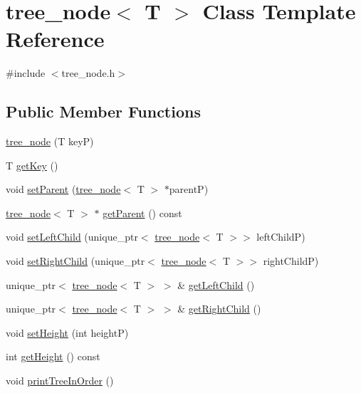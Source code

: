 \hypertarget{classtree__node}{}\section{tree\+\_\+node$<$ T $>$ Class Template Reference}
\label{classtree__node}


{\ttfamily \#include $<$tree\+\_\+node.\+h$>$}

\subsection*{Public Member Functions}
\begin{DoxyCompactItemize}
\item 
\hyperlink{classtree__node_a776da4de6a1faef8b984f8b6dfe6eb6a}{tree\+\_\+node} (T keyP)
\item 
T \hyperlink{classtree__node_afbe2d91ad009570338290ed9eb8a7485}{get\+Key} ()
\item 
void \hyperlink{classtree__node_a1fe75baae3a5d9caa9cb886c54c291e2}{set\+Parent} (\hyperlink{classtree__node}{tree\+\_\+node}$<$ T $>$ $\ast$parentP)
\item 
\hyperlink{classtree__node}{tree\+\_\+node}$<$ T $>$ $\ast$ \hyperlink{classtree__node_aa17e609b57f77bb5446d83c964409ac4}{get\+Parent} () const
\item 
void \hyperlink{classtree__node_a3db979969a0fe8505ba65c7afabb5463}{set\+Left\+Child} (unique\+\_\+ptr$<$ \hyperlink{classtree__node}{tree\+\_\+node}$<$ T $>$$>$ left\+ChildP)
\item 
void \hyperlink{classtree__node_afea4c6595dafba65b5c4e59ca3da30f3}{set\+Right\+Child} (unique\+\_\+ptr$<$ \hyperlink{classtree__node}{tree\+\_\+node}$<$ T $>$$>$ right\+ChildP)
\item 
unique\+\_\+ptr$<$ \hyperlink{classtree__node}{tree\+\_\+node}$<$ T $>$ $>$ \& \hyperlink{classtree__node_ae161b70a3780e0cb3ecd4b57acc9e2d1}{get\+Left\+Child} ()
\item 
unique\+\_\+ptr$<$ \hyperlink{classtree__node}{tree\+\_\+node}$<$ T $>$ $>$ \& \hyperlink{classtree__node_a5e584d47f2c11941fe0406836fe50159}{get\+Right\+Child} ()
\item 
void \hyperlink{classtree__node_a159ebd6d96c0e2111eb0ef6a36d50471}{set\+Height} (int heightP)
\item 
int \hyperlink{classtree__node_a57c8b2000ad0a13b67532b81ba73720b}{get\+Height} () const
\item 
void \hyperlink{classtree__node_ae87818a195621d4defc1cde67e7219ee}{print\+Tree\+In\+Order} ()

\end{DoxyCompactItemize}
